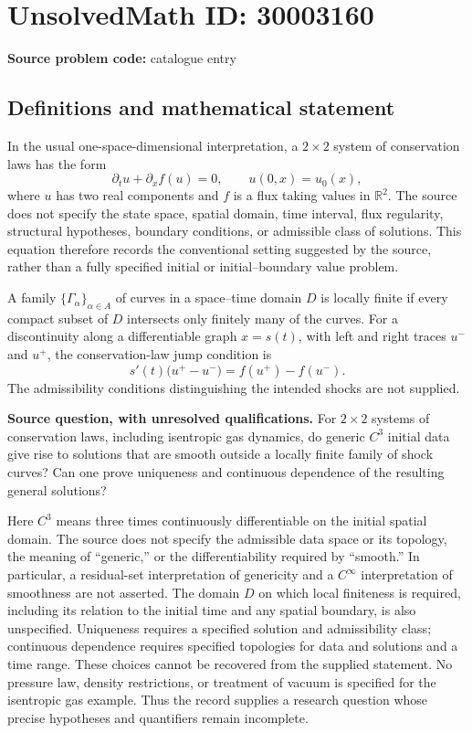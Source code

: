 \documentclass[11pt]{article}
\newcommand{\R}{\mathbb{R}}
\begin{document}
\section*{UnsolvedMath ID: 30003160}
\textbf{Source problem code:} catalogue entry
\subsection{Definitions and mathematical statement}
In the usual one-space-dimensional interpretation, a \(2\times2\) system of conservation laws has the form
\[
\partial_t u+\partial_x f(u)=0,\qquad u(0,x)=u_0(x),
\]
where \(u\) has two real components and \(f\) is a flux taking values in \(\R^2\). The source does not specify the state space, spatial domain, time interval, flux regularity, structural hypotheses, boundary conditions, or admissible class of solutions. This equation therefore records the conventional setting suggested by the source, rather than a fully specified initial or initial--boundary value problem.

A family \(\{\Gamma_\alpha\}_{\alpha\in A}\) of curves in a space--time domain \(D\) is locally finite if every compact subset of \(D\) intersects only finitely many of the curves. For a discontinuity along a differentiable graph \(x=s(t)\), with left and right traces \(u^-\) and \(u^+\), the conservation-law jump condition is
\[
 s'(t)\bigl(u^+-u^-\bigr)=f(u^+)-f(u^-).
\]
The admissibility conditions distinguishing the intended shocks are not supplied.

\textbf{Source question, with unresolved qualifications.} For \(2\times2\) systems of conservation laws, including isentropic gas dynamics, do generic \(C^3\) initial data give rise to solutions that are smooth outside a locally finite family of shock curves? Can one prove uniqueness and continuous dependence of the resulting general solutions?

Here \(C^3\) means three times continuously differentiable on the initial spatial domain. The source does not specify the admissible data space or its topology, the meaning of ``generic,'' or the differentiability required by ``smooth.'' In particular, a residual-set interpretation of genericity and a \(C^\infty\) interpretation of smoothness are not asserted. The domain \(D\) on which local finiteness is required, including its relation to the initial time and any spatial boundary, is also unspecified. Uniqueness requires a specified solution and admissibility class; continuous dependence requires specified topologies for data and solutions and a time range. These choices cannot be recovered from the supplied statement. No pressure law, density restrictions, or treatment of vacuum is specified for the isentropic gas example. Thus the record supplies a research question whose precise hypotheses and quantifiers remain incomplete.
\end{document}
